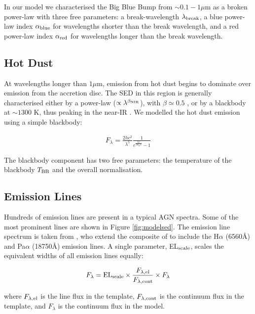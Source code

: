 In our model we characterised the Big Blue Bump from $\sim 0.1 - 1 \mu$m as a broken power-law with three free parameters: a break-wavelength $\lambda_{\rm break}$, a blue power-law index $\alpha_{\rm blue}$ for wavelengths shorter than the break wavelength, and a red power-law index $\alpha_{\rm red}$ for wavelengths longer than the break wavelength.   

\subsection{Hot Dust}

At wavelengths longer than $1\mu$m, emission from hot dust begins to dominate over emission from the accretion disc. The SED in this region is generally characterised either by a power-law ($\propto \lambda^{\beta_{\rm NIR}}$), with $\beta \simeq 0.5$ \citep[e.g.][]{richards06, zhang14}, or by a blackbody at $\sim 1300$ K, thus peaking in the near-IR \citep[e.g.][]{leipski14}. We modelled the hot dust emission using a simple blackbody:

\begin{eqnarray}  
  F_\lambda =\frac{2 hc^2}{\lambda^5}\frac{1}{ e^{\frac{hc}{\lambda k_\mathrm{B}T}} - 1} 
\end{eqnarray}

The blackbody component has two free parameters: the temperature of the blackbody $T_{\rm BB}$ and the overall normalisation. 
 
\subsection{Emission Lines}

Hundreds of emission lines are present in a typical AGN spectra. Some of the most prominent lines are shown in Figure \ref{fig:modelsed}. The emission line spectrum is taken from \citet{maddox06}, who extend the composite of \citet{francis91} to include the H$\alpha$ (6560\AA) and Pa$\alpha$ (18750\AA) emission lines. A single parameter, EL$_{\rm scale}$, scales the equivalent widths of all emission lines equally:

\begin{eqnarray}
  F_{\lambda} =  {\rm EL}_{\rm scale} \times \frac{F_{\lambda, \rm el}}{F_{\lambda, \rm cont}} \times F_{\lambda} 
\end{eqnarray} 

where $F_{\lambda, \rm el}$ is the line flux in the template, $F_{\lambda,\rm cont}$ is the continuum flux in the template, and $F_{\lambda}$ is the continuum flux in the model.  

